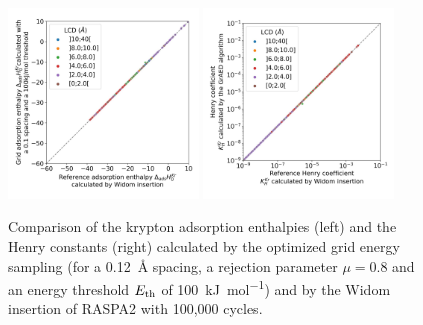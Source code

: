 \documentclass[main]{subfiles}
\begin{document}
\begin{figure}[ht]
  \centering
    \includegraphics[width=0.45\textwidth]{figures/3-fastsim/H_Kr_0_widom_vs_H_Kr_grid_overview.jpg}
    \hfill
    \includegraphics[width=0.45\textwidth]{figures/3-fastsim/K_Kr_widom_vs_K_Kr_grid_overview.jpg}
    \caption{Comparison of the krypton adsorption enthalpies (left) and the Henry constants (right) calculated by the optimized grid energy sampling (for a \SI{0.12}{\angstrom} spacing, a rejection parameter $\mu=0.8$ and an energy threshold $E_{\text{th}}$ of \SI{100}{\kilo\joule\per\mole}) and by the Widom insertion of RASPA2 with 100,000 cycles. }\label{fgr:grid_widom_kr}
\end{figure}
\end{document}
